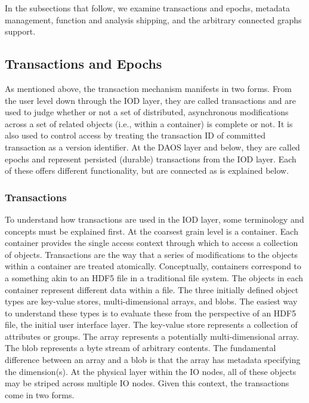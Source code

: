 \documentclass[conference]{IEEEtran} \pdfpagewidth=8.5in
\begin{document}
In the subsections that follow, we examine transactions and epochs, metadata
management, function and analysis shipping, and the arbitrary connected graphs
support.

\subsection{Transactions and Epochs}
\label{sec:transactions}

As mentioned above, the transaction mechanism manifests in two forms. From the
user level down through the IOD layer, they are called transactions and are
used to judge whether or not a set of distributed, asynchronous modifications
across a set of related objects (i.e., within a container) is complete or not.
It is also used to control access by treating the transaction ID of committed
transaction as a version identifier.  At the DAOS layer and below, they are
called epochs and represent persisted (durable) transactions from the IOD
layer. Each of these offers different functionality, but are connected as is
explained below.

\subsubsection{Transactions}
To understand how transactions are used in the IOD layer, some terminology and
concepts must be explained first. At the coarsest grain level is a container.
Each container provides the single access context through which to access a
collection of objects. Transactions are the way that a series of modifications
to the objects within a container are treated atomically. Conceptually,
containers correspond to a something akin to an HDF5 file in a traditional
file system. The objects in each container represent different data within a
file.  The three initially defined object types are key-value stores,
multi-dimensional arrays, and blobs.  The easiest way to understand these types
is to evaluate these from the perspective of an HDF5 file, the initial user
interface layer. The key-value store represents a collection of attributes or
groups. The array represents a potentially multi-dimensional array.  The blob
represents a byte stream of arbitrary contents.  The fundamental difference
between an array and a blob is that the array has metadata specifying the
dimension(s). At the physical layer within the IO nodes, all of these objects
may be striped across multiple IO nodes.  Given this context, the transactions
come in two forms.
\end{document}
